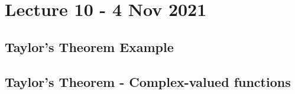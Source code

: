 \section{Lecture 10 - 4 Nov 2021}
\subsection{Taylor's Theorem Example}
\subsection{Taylor's Theorem - Complex-valued functions}
